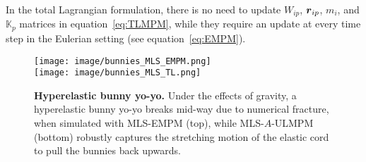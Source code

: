 In the total Lagrangian formulation, there is no need to update $W_{ip}$, $\boldsymbol{r}_{ip}$, $m_i$, and $\mathbb{K}_p$ matrices in equation~\eqref{eq:TLMPM}, while they require an update at every time step in the Eulerian setting (see equation~\eqref{eq:EMPM}). 
\begin{figure*}[h!]
    \centering
    \texttt{[image: image/bunnies\_MLS\_EMPM.png]}\\
    \texttt{[image: image/bunnies\_MLS\_TL.png]}\\
     \vspace{-4mm}
     \caption{\textbf{Hyperelastic bunny yo-yo.} Under the effects of gravity, a hyperelastic bunny yo-yo breaks mid-way due to numerical fracture, when simulated with MLS-EMPM (top), while MLS-$A$-ULMPM (bottom) robustly captures the stretching motion of the elastic cord to pull the bunnies back upwards.}
    \label{fig:strechy_bunny_1}
        \vspace{-3mm}
\end{figure*}
\vspace{-3mm}
